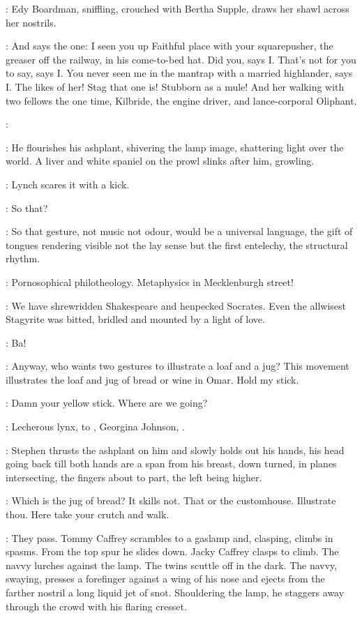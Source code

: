 :
Edy Boardman, sniffling, crouched with Bertha Supple,
draws her shawl across her nostrils.

\Edy:
And says the one:
I seen you up Faithful place with your squarepusher,
the greaser off the railway, in his come-to-bed hat.
Did you, says I.
That's not for you to say, says I.
You never seen
me in the mantrap with a married highlander, says I.
The likes of her!
Stag that one is!
Stubborn as a mule!
And her walking with two fellows the one time,
Kilbride, the engine driver, and lance-corporal Oliphant.

\Stephen:

:
He flourishes his ashplant, shivering the lamp image,
shattering light over the world.
A liver and white spaniel on the prowl slinks after him, growling.

:
Lynch scares it with a kick.

\Lynch:
So that?

\Stephen:
So that gesture, not music not odour, would be a universal language,
the gift of tongues rendering visible not the lay sense
but the first entelechy, the structural rhythm.

\Lynch:
Pornosophical philotheology.
Metaphysics in Mecklenburgh street!

\Stephen:
We have shrewridden Shakespeare and henpecked Socrates.
Even the allwisest Stagyrite was bitted, bridled and mounted by a light of love.

\Lynch:
Ba!

\Stephen:
Anyway, who wants two gestures to illustrate a loaf and a jug?
This movement illustrates the loaf and jug of bread or wine in Omar.
Hold my stick.

\Lynch:
Damn your yellow stick.
Where are we going?

\Stephen:
Lecherous lynx, to , Georgina Johnson,
.

:
Stephen thrusts the ashplant on him and slowly holds out his hands,
his head going back till both hands are a span from his breast, down turned,
in planes intersecting, the fingers about to part, the left being higher.

\Lynch:
Which is the jug of bread? It skills not.
That or the customhouse.
Illustrate thou.
Here take your crutch and walk.

:
They pass.
Tommy Caffrey scrambles to a gaslamp and, clasping, climbs in spasms.
From the top spur he slides down.
Jacky Caffrey clasps to climb.
The navvy lurches against the lamp.
The twins scuttle off in the dark.
The navvy, swaying, presses a forefinger against a wing of his nose and
ejects from the farther nostril a long liquid jet of snot.
Shouldering the lamp, he staggers away through the crowd with his flaring cresset.

